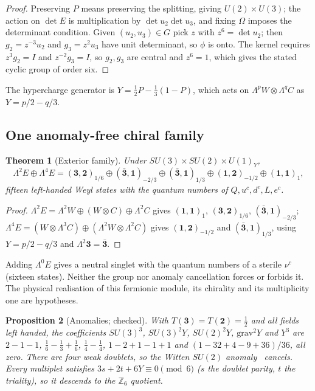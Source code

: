 \documentclass[11pt]{article}
\newtheorem{theorem}{Theorem}[section]
\newtheorem{proposition}[theorem]{Proposition}
\theoremstyle{definition}
\theoremstyle{remark}
\newcommand{\Z}{\mathbb{Z}}
\begin{document}
\begin{proof}
Preserving $P$ means preserving the splitting, giving $U(2)\times U(3)$; the action on
$\det E$ is multiplication by $\det u_2\det u_3$, and fixing $\Omega$ imposes the
determinant condition. Given $(u_2,u_3)\in G$ pick $z$ with $z^6=\det u_2$; then
$g_2=z^{-3}u_2$ and $g_3=z^2u_3$ have unit determinant, so $\phi$ is onto. The kernel
requires $z^3g_2=I$ and $z^{-2}g_3=I$, so $g_2,g_3$ are central and $z^6=1$, which gives
the stated cyclic group of order six.
\end{proof}

The hypercharge generator is $Y=\frac12P-\frac13(1-P)$, which acts on
$\Lambda^pW\otimes\Lambda^qC$ as $Y=p/2-q/3$.

\subsection{One anomaly-free chiral family}

\begin{theorem}[Exterior family]
\label{thm:family}
Under $SU(3)\times SU(2)\times U(1)_Y$,
\begin{equation}
\Lambda^2E\oplus\Lambda^4E=(\mathbf3,\mathbf2)_{1/6}\oplus(\bar{\mathbf3},\mathbf1)_{-2/3}
\oplus(\bar{\mathbf3},\mathbf1)_{1/3}\oplus(\mathbf1,\mathbf2)_{-1/2}\oplus(\mathbf1,\mathbf1)_{1},
\end{equation}
fifteen left-handed Weyl states with the quantum numbers of $Q,u^c,d^c,L,e^c$.
\end{theorem}

\begin{proof}
$\Lambda^2E=\Lambda^2W\oplus(W\otimes C)\oplus\Lambda^2C$ gives $(\mathbf1,\mathbf1)_1$,
$(\mathbf3,\mathbf2)_{1/6}$, $(\bar{\mathbf3},\mathbf1)_{-2/3}$; $\Lambda^4E=(W\otimes
\Lambda^3C)\oplus(\Lambda^2W\otimes\Lambda^2C)$ gives $(\mathbf1,\mathbf2)_{-1/2}$ and
$(\bar{\mathbf3},\mathbf1)_{1/3}$, using $Y=p/2-q/3$ and $\Lambda^2\mathbf3=\bar{\mathbf3}$.
\end{proof}

Adding $\Lambda^0E$ gives a neutral singlet with the quantum numbers of a sterile
$\nu^c$ (sixteen states). Neither the group nor anomaly cancellation forces or forbids
it. The physical realisation of this fermionic module, its chirality and its
multiplicity one are hypotheses.

\begin{proposition}[Anomalies; checked]
\label{prop:anomaly}
With $T(\mathbf3)=T(\mathbf2)=\tfrac12$ and all fields left handed, the coefficients
$SU(3)^3$, $SU(3)^2Y$, $SU(2)^2Y$, $\mathrm{grav}^2Y$ and $Y^3$ are
$2-1-1$, $\tfrac16-\tfrac13+\tfrac16$, $\tfrac14-\tfrac14$, $1-2+1-1+1$ and
$(1-32+4-9+36)/36$, all zero. There are four weak doublets, so the Witten $SU(2)$
anomaly~\cite{witten1982} cancels. Every multiplet satisfies $3s+2t+6Y\equiv0\pmod6$ ($s$ the doublet
parity, $t$ the triality), so it descends to the $\Z_6$ quotient.
\end{proposition}
\end{document}
